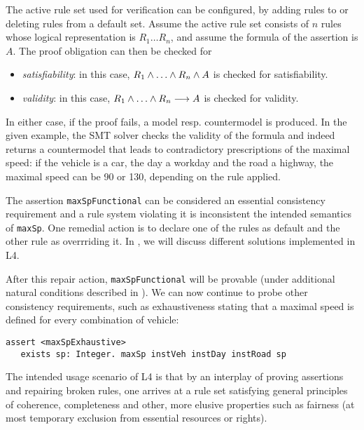 The active rule set used for verification can be configured, by adding rules
to or deleting rules from a default set. Assume the active rule set consists
of $n$ rules whose logical representation is $R_1 \dots R_n$, and assume the
formula of the assertion is $A$. The proof obligation can then be checked for
\begin{itemize}
\item  \emph{satisfiability}: in this case, $R_1 \AND \dots \AND R_n \AND A$
  is checked for satisfiability.
\item \emph{validity}: in this case, $R_1 \AND \dots \AND R_n \IMPL A$ is
  checked for validity.
\end{itemize}
In either case, if the proof fails, a model resp.{} countermodel is produced.
In the given example, the SMT solver checks the validity of the formula and
indeed returns a countermodel that leads to contradictory prescriptions of the
maximal speed: if the vehicle is a car, the day a workday and the road a
highway, the maximal speed can be 90 or 130, depending on the rule applied.

The assertion \texttt{maxSpFunctional} can be considered an essential
consistency requirement and a rule system violating it is inconsistent \wrt{} the intended semantics of \texttt{maxSp}. One
remedial action is to declare one of the rules as default and the other rule
as overrriding it. In , we will discuss different solutions
implemented in L4.

After this repair action, \texttt{maxSpFunctional} will be provable (under
additional natural conditions described in ). We can now
continue to probe other consistency requirements, such as exhaustiveness
stating that a maximal speed is defined for every combination of vehicle:

\begin{lstlisting}
assert <maxSpExhaustive>
   exists sp: Integer. maxSp instVeh instDay instRoad sp
\end{lstlisting}

The intended usage scenario of L4 is that by an interplay of proving
assertions and repairing broken rules, one arrives at a rule set satisfying
general principles of coherence, completeness and other, more elusive
properties such as fairness (at most temporary exclusion from essential
resources or rights).


